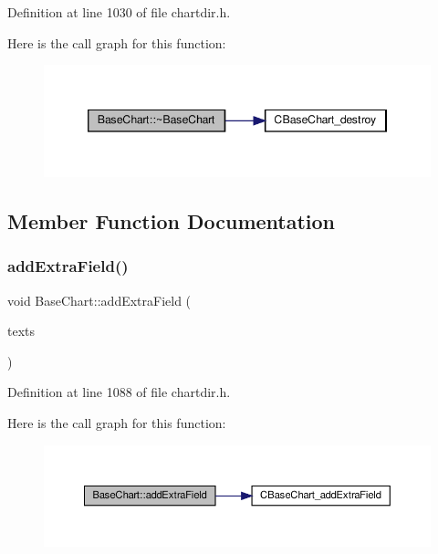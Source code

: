 Definition at line 1030 of file chartdir.\+h.

Here is the call graph for this function\+:
\nopagebreak
\begin{figure}[H]
\begin{center}
\leavevmode
\includegraphics[width=346pt]{class_base_chart_a4a4e22d0f3a1ae31032a3869406c4b0d_cgraph}
\end{center}
\end{figure}


\subsection{Member Function Documentation}
\mbox{\label{class_base_chart_a186739200492658bd4e1d73d025ffdf1}} 
\subsubsection{\texorpdfstring{add\+Extra\+Field()}{addExtraField()}\hspace{0.1cm}{\footnotesize\ttfamily [1/2]}}
{\footnotesize\ttfamily void Base\+Chart\+::add\+Extra\+Field (\begin{DoxyParamCaption}\item[{\hyperlink{class_string_array}{String\+Array}}]{texts }\end{DoxyParamCaption})\hspace{0.3cm}{\ttfamily [inline]}}



Definition at line 1088 of file chartdir.\+h.

Here is the call graph for this function\+:
\nopagebreak
\begin{figure}[H]
\begin{center}
\leavevmode
\includegraphics[width=350pt]{class_base_chart_a186739200492658bd4e1d73d025ffdf1_cgraph}
\end{center}
\end{figure}
\mbox{\label{class_base_chart_a485ce8c856c9d27abf934103ad5db4ee}} 
